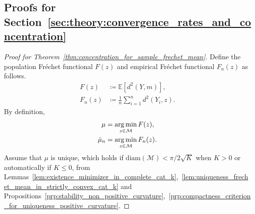 \clearpage

\subsection{Proofs for Section~\ref{sec:theory:convergence_rates_and_concentration}}

\begin{proof}[Proof for Theorem~\ref{thm:concentration_for_sample_frechet_mean}]
    Define the population Fréchet functional $F(z)$ and empirical Fréchet functional $F_n(z)$ as follows.
    \begin{align*}
        F(z) &\coloneqq \mathbb{E}[d^2(Y, m)], \\
        F_n(z) &\coloneqq \frac{1}{n}\sum^n_{i=1}d^2(Y_i, z).
    \end{align*}
    By definition,
    \begin{align*}
        \mu &= \operatorname*{arg\,min}_{z \in \mathcal{M}} F(z), \\
        \hat{\mu}_n &= \operatorname*{arg\,min}_{z \in \mathcal{M}} F_n(z).
    \end{align*}
    Assume that $\mu$ is unique, which holds if $\mathrm{diam}(\mathcal{M}) < \pi / 2\sqrt{K}$ when $K > 0$ or automatically if $K \leq 0$, from Lemmas~\ref{lem:existence_minimizer_in_complete_cat_k},~\ref{lem:uniqueness_frechet_mean_in_strictly_convex_cat_k} and Propositions~\ref{prp:stability_non_positive_curvature},~\ref{prp:compactness_criterion_for_uniqueness_positive_curvature}.


\end{proof}
